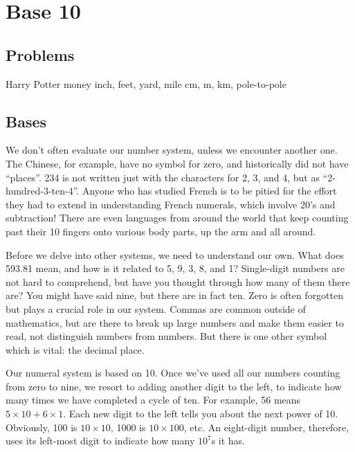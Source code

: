 


\newpage
\chapterminitoc

\newpage
\section{Base 10}\label{sec:base10}
\subsection{Problems}
Harry Potter money
inch, feet, yard, mile
cm, m, km, pole-to-pole
\subsection{Bases}
We don't often evaluate our number system, unless we encounter another one.  The Chinese, for
example, have no symbol for zero, and historically did not have ``places''.  234 is not written just
with the characters for 2, 3, and 4, but as ``2-hundred-3-ten-4''.  Anyone who has studied French
is to be pitied for the effort they had to extend in understanding French numerals, which involve
20's and subtraction!  There are even languages from around the world that keep counting past
their 10 fingers onto various body parts, up the arm and all around.

Before we delve into other systems, we need to understand our own.  What does 593.81 mean, 
and how is it related to 5, 9, 3, 8, and 1?  Single-digit numbers are not hard to comprehend, but
have you thought through how many of them there are?  You might have said nine, but there are
in fact ten.  Zero is often forgotten but plays a crucial role in our system.  Commas are common
outside of mathematics, but are there to break up large numbers and make them easier to read,
not distinguish numbers from numbers.  But there is one other symbol which is vital: the decimal
place.

Our numeral system is based on 10.  Once we've used all our numbers counting from zero to nine,
we resort to adding another digit to the left, to indicate how many times we have completed a cycle
of ten.  For example, 56 means $5\times10 + 6\times1$.  Each new digit to the left tells you about 
the next power of 10.  Obviously, 100 is $10\times10$, 1000 is $10\times100$, etc.  An eight-digit
number, therefore, uses its left-most digit to indicate how many $10^7$s it has.

